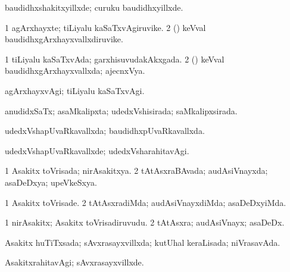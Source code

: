 {{\bentry
{} 
\gl{\kirxvi}
\expl{}
\bmng
baudidhxshakitxyillxde; curuku baudidhxyillxde. 
\emng
\eentry

\bentry
{} 
\gl{\nA}
\expl{}
\bmng
\bnum
\num{1} agArxhayxte; tiLiyalu kaSaTxvAgiruvike. 
\num{2} (\tashA) keVval baudidhxgArxhayxvallxdiruvike. 
\enum
\emng
\eentry

\bentry
{} 
\gl{\gu}
\expl{}
\bmng
\bnum
\num{1} tiLiyalu kaSaTxvAda; garxhisuvudakAkxgada. 
\num{2} (\tashA) keVval baudidhxgArxhayxvallxda; ajecnxVya. 
\enum
\emng
\eentry

\bentry
{} 
\gl{\nA}
\expl{}
\bmng
{} 
\emng
\eentry

\bentry
{} 
\gl{\kirxvi}
\expl{}
\bmng
agArxhayxvAgi; tiLiyalu kaSaTxvAgi. 
\emng
\eentry

\bentry
{} 
\gl{\gu}
\expl{}
\bmng
anudidxSaTx; asaMkalipxta; udedxVshisirada; saMkalipxsirada. 
\emng
\eentry

\bentry
{} 
\gl{\gu}
\expl{}
\bmng
udedxVshapUvaRkavallxda; baudidhxpUvaRkavallxda. 
\emng
\eentry

\bentry
{} 
\gl{\kirxvi}
\expl{}
\bmng
udedxVshapUvaRkavallxde; udedxVsharahitavAgi. 
\emng
\eentry

\bentry
{} 
\gl{\gu}
\expl{}
\bmng
\bnum
\num{1} Asakitx toVrisada; nirAsakitxya. 
\num{2} tAtAsxraBAvada; audAsiVnayxda; asaDeDxya; upeVkeSxya. 
\enum
\emng
\eentry

\bentry
{} 
\gl{\kirxvi}
\expl{}
\bmng
\bnum
\num{1} Asakitx toVrisade. 
\num{2} tAtAsxradiMda; audAsiVnayxdiMda; asaDeDxyiMda. 
\enum
\emng
\eentry

\bentry
{} 
\gl{\nA}
\expl{}
\bmng
\bnum
\num{1} nirAsakitx; Asakitx toVrisadiruvudu. 
\num{2} tAtAsxra; audAsiVnayx; asaDeDx. 
\enum
\emng
\eentry

\bentry
{} 
\gl{\gu}
\expl{}
\bmng
Asakitx huTiTxsada; sAvxrasayxvillxda; kutUhal keraLisada; niVrasavAda. 
\emng
\eentry

\bentry
{} 
\gl{\kirxvi}
\expl{}
\bmng
AsakitxrahitavAgi; sAvxrasayxvillxde. 
\emng
\eentry

}}
